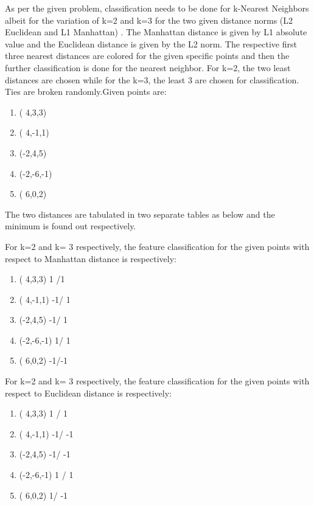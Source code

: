 

As per the given problem, classification needs to be done for k-Nearest Neighbors albeit for the variation of k=2 and k=3 for the two given distance norms (L2 Euclidean and L1 Manhattan) . The Manhattan distance is given by L1 absolute value and the Euclidean distance is given by the L2 norm.
 The respective first three nearest distances are colored for the given specific points and then the further classification is done for the nearest neighbor. For k=2, the two least distances are chosen while for the k=3, the least 3 are chosen for classification. Ties are broken randomly.Given points are:
\begin {enumerate}
	\item( 4,3,3)   
	\item( 4,-1,1)  
	\item(-2,4,5)   
	\item(-2,-6,-1) 
	\item( 6,0,2)  
\end {enumerate}
The two distances are tabulated in two separate tables as below and the minimum is found out respectively.


For k=2 and k= 3 respectively, the feature classification for the given points with respect to Manhattan distance is respectively:
\begin {enumerate}
	\item( 4,3,3)      1 /1
	\item( 4,-1,1)    -1/ 1
	\item(-2,4,5)     -1/ 1
	\item(-2,-6,-1)    1/ 1
	\item( 6,0,2)      -1/-1
\end {enumerate}
For k=2 and k= 3 respectively, the feature classification for the given points with respect to Euclidean distance is respectively:
\begin {enumerate}
	\item( 4,3,3)     1 /  1
	\item( 4,-1,1)   -1/ -1
	\item(-2,4,5)    -1/ -1
	\item(-2,-6,-1)   1 / 1
	\item( 6,0,2)      1/ -1
\end {enumerate}
